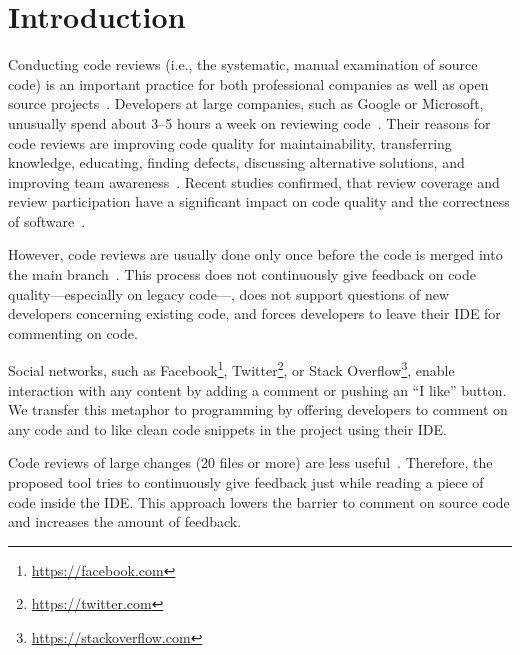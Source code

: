 
\section{Introduction}
Conducting code reviews (i.e., the systematic, manual examination of source code) is an important practice for both professional companies as well as open source projects~\cite{balachandran2013PeerCodeReviews, bird2015CodeReviewPlatform, czerwonka2015codereviews, rigby2014PeerReviewOSS, feitelson2013development, rigby2013PeerCodeReviews}.
%
Developers at large companies, such as Google or Microsoft, unusually spend about 3--5 hours a week on reviewing code~\cite{bosu2017ContemporaryCodeReview,Sadowski2018Google}.
%
Their reasons for code reviews are improving code quality for maintainability, transferring knowledge, educating, finding defects, discussing alternative solutions, and improving team awareness~\cite{rigby2013PeerCodeReviews, bacchelli2013expectations, bosu2017ContemporaryCodeReview, Sadowski2018Google}.
%
Recent studies confirmed, that review coverage and review participation have a significant impact on code quality and the correctness of software~\cite{mcintosh2014impact, mcintosh2016empirical, thongtanunam2015CodeReviews, shimagaki2016CRInSony}. 
%

%
However, code reviews are usually done only once before the code is merged into the main branch~\cite{rigby2013PeerCodeReviews, Sadowski2018Google}. 
%
This process does not continuously give feedback on code quality---especially on legacy code---, does not support questions of new developers concerning existing code, and forces developers to leave their IDE for commenting on code.
%

%
Social networks, such as Facebook\footnote{\url{https://facebook.com}}, Twitter\footnote{\url{https://twitter.com}}, or Stack Overflow\footnote{\url{https://stackoverflow.com}}, enable interaction with any content by adding a comment or pushing an \enquote{I like} button.
% 
We transfer this metaphor to programming by offering developers to comment on any code and to like clean code snippets in the project using their IDE.  
%

%
Code reviews of large changes (20 files or more) are less useful~\cite{czerwonka2015codereviews}.
%
Therefore, the proposed tool tries to continuously give feedback just while reading a piece of code inside the IDE. 
%
This approach lowers the barrier to comment on source code and increases the amount of feedback.
%
%